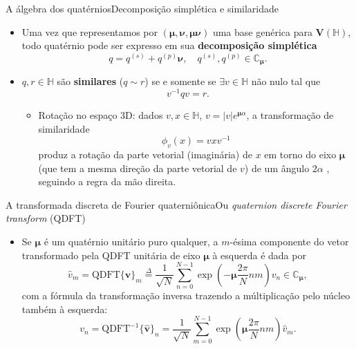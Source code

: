 \documentclass[10pt,compress]{beamer}
\newcommand{\qmu}{\boldsymbol{\mu}}
\newcommand{\qnu}{\boldsymbol{\nu}}
\newcommand{\qV}{\boldsymbol{V}}
\newcommand{\colorcite}[1]{{\color{mygray}#1}}
\begin{document}
\begin{frame}{A \'algebra dos quat\'ernios}{Decomposi\c c\~ao simpl\'etica e similaridade}
\begin{itemize}
\item Uma vez que representamos por $ (\qmu, \qnu, \qmu \qnu) $ uma base gen\'erica para $ \qV(\mathbb{H}) $, todo quat\'ernio pode ser expresso em sua \textbf{decomposi\c c\~ao simpl\'etica}
\begin{equation}
\label{eq:decomposicao}
q = q^{(s)} + q^{(p)} \qnu, \quad q^{(s)}, q^{(p)} \in \mathbb{C}_{\qmu}.
\end{equation}

\item $ q, r \in \mathbb{H} $ s\~ao \textbf{similares} ($ q \sim r $) se e somente se $ \exists v \in \mathbb{H} $ n\~ao nulo tal que
\begin{equation}
v^{-1}q v = r.
\end{equation}
\begin{itemize}
\item Rota\c c\~ao no espa\c co 3D: dados $ v,x \in \mathbb{H} $, $ v = |v| e^{\qmu \alpha}$, a transforma\c c\~ao de similaridade
\begin{equation}
\label{eq:rotacao}
\phi_v(x) = v x v^{-1}
\end{equation}
produz a rota\c c\~ao da parte vetorial (imagin\'aria) de $ x $ em torno do eixo $ \qmu $ (que tem a mesma dire\c c\~ao da parte vetorial de $ v $) de um \^angulo $ 2\alpha $ \colorcite{\cite{ward2012quaternions}}, seguindo a regra da m\~ao direita.
\end{itemize}
\end{itemize}
\end{frame}

\begin{frame}{A transformada discreta de Fourier quaterni\^onica}{Ou \textit{quaternion discrete Fourier transform} (QDFT)}
\begin{itemize}
\item Se $ \qmu $ \'e um quat\'ernio unit\'ario puro qualquer, a $ m $-\'esima componente do vetor transformado pela QDFT unit\'aria de eixo $ \qmu $ \`a esquerda \'e dada por
\begin{equation}
\label{eq:QDFT_fwd}
\widehat{v}_m = \text{QDFT}\{ \mathbf{v} \}_m \overset{\Delta}{=} \frac{1}{\sqrt{N}} \sum_{n=0}^{N-1}  \exp \left( -\qmu \frac{2\pi}{N} nm \right) v_n \in \mathbb{C}_{\qmu},
\end{equation}
com a f\'ormula da transforma\c c\~ao inversa trazendo a m\'ultiplica\c c\~ao pelo n\'ucleo tamb\'em \`a esquerda:
\begin{equation}
\label{eq:QDFT_inv}
v_n = \text{QDFT}^{-1}\{ \widehat{\mathbf{v}} \}_n = \frac{1}{\sqrt{N}}\sum_{m=0}^{N-1}  \exp \left( \qmu \frac{2\pi}{N} nm \right) \widehat{v}_m.
\end{equation}
\end{itemize}
\end{frame}
\end{document}

